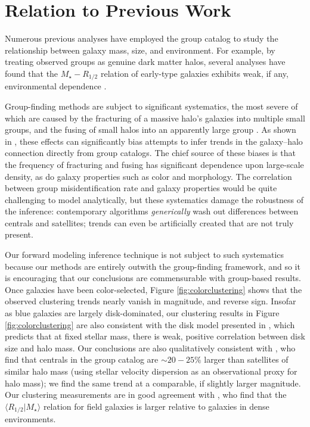 \documentclass[usenatbib,usegraphicx,letterpaper]{mn2e}
\newcommand{\rhalf}{R_{1/2}}
\newcommand{\mstar}{M_{\star}}
\newcommand{\mean}[2]{\langle{#1}\vert{#2}\rangle}
\begin{document}
\section{Relation to Previous Work}
\label{sec:previous_work}

Numerous previous analyses have employed the \citet{yang_etal05b} group catalog to study the relationship between galaxy mass, size, and environment. For example, by treating observed groups as genuine dark matter halos, several analyses have found that the $\mstar-\rhalf$ relation of early-type galaxies exhibits weak, if any, environmental dependence \citep{weinmann_etal08,huertas_company_etal13b,shankar_etal14}.


Group-finding methods are subject to significant systematics, the most severe of which are caused by the fracturing of a massive halo's galaxies into multiple small groups, and the fusing of small halos into an apparently large group \citep{duarte_mamon14}. As shown in \citet{campbell_etal15}, these effects can significantly bias attempts to infer trends in the galaxy--halo connection directly from group catalogs. The chief source of these  biases is that the frequency of fracturing and fusing has significant dependence upon large-scale density, as do galaxy properties such as color and morphology. The correlation between group misidentification rate and galaxy properties would be quite challenging to model analytically, but these systematics damage the robustness of the inference: contemporary algorithms {\em generically} wash out differences between centrals and satellites; trends can even be artificially created that are not truly present.

 Our forward modeling inference technique is not subject to such systematics because our methods are entirely outwith the group-finding framework, and so it is encouraging that our conclusions are commensurable with group-based results. Once galaxies have been color-selected, Figure \ref{fig:colorclustering} shows that the observed clustering trends nearly vanish in magnitude, and reverse sign. Insofar as blue galaxies are largely disk-dominated, our clustering results in Figure \ref{fig:colorclustering} are also consistent with the disk model presented in \citet{dutton_etal08,dutton_etal10}, which predicts that at fixed stellar mass, there is weak, positive correlation between disk size and halo mass. Our conclusions are also qualitatively consistent with \citet{spindler_wake17}, who find that centrals in the \citet{yang_etal05a} group catalog are $\sim20-25\%$ larger than satellites of similar halo mass (using stellar velocity dispersion as an observational proxy for halo mass); we find the same trend at a comparable, if slightly larger magnitude. Our clustering measurements are in good agreement with \citet{cebrian_trujillo14}, who find that the $\mean{\rhalf}{\mstar}$ relation for field galaxies is larger relative to galaxies in dense environments.
\end{document}
